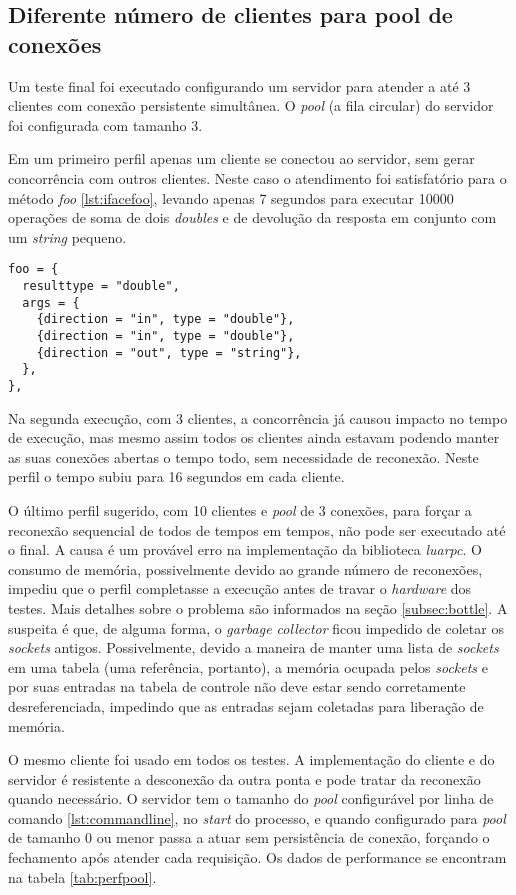 \documentclass[11pt]{article}
\begin{document}
\subsection{Diferente número de clientes para pool de conexões}\label{subsec:diffpool}

Um teste final foi executado configurando um servidor para atender a até 3
clientes com conexão persistente simultânea. O \textit{pool} (a fila circular)
do servidor foi configurada com tamanho 3.

Em um primeiro perfil apenas um cliente se conectou ao servidor, sem gerar
concorrência com outros clientes. Neste caso o atendimento foi satisfatório para
o método \textit{foo} \ref{lst:ifacefoo}, levando apenas 7 segundos para executar
10000 operações de soma de dois \textit{doubles} e de devolução da resposta em
conjunto com um \textit{string} pequeno.

\begin{lstlisting}[caption={Interface foo},label={lst:ifacefoo}]
foo = {
  resulttype = "double",
  args = {
    {direction = "in", type = "double"},
    {direction = "in", type = "double"},
    {direction = "out", type = "string"},
  },
},
\end{lstlisting}

Na segunda execução, com 3 clientes, a concorrência já causou impacto no tempo
de execução, mas mesmo assim todos os clientes ainda estavam podendo manter as
suas conexões abertas o tempo todo, sem necessidade de reconexão. Neste perfil o
tempo subiu para 16 segundos em cada cliente.

O último perfil sugerido, com 10 clientes e \textit{pool} de 3 conexões, para
forçar a reconexão sequencial de todos de tempos em tempos, não pode ser
executado até o final. A causa é um provável erro na implementação da biblioteca
\textit{luarpc}. O consumo de memória, possivelmente devido ao grande número de
reconexões, impediu que o perfil completasse a execução antes de travar o
\textit{hardware} dos testes. Mais detalhes sobre o problema são informados na
seção \ref{subsec:bottle}. A suspeita é que, de alguma forma, o \textit{garbage
collector} ficou impedido de coletar os \textit{sockets} antigos. Possivelmente,
devido a maneira de manter uma lista de \textit{sockets} em uma tabela (uma
referência, portanto), a memória ocupada pelos \textit{sockets} e por suas
entradas na tabela de controle não deve estar sendo corretamente
desreferenciada, impedindo que as entradas sejam coletadas para liberação de
memória.

O mesmo cliente foi usado em todos os testes. A implementação do cliente e do
servidor é resistente a desconexão da outra ponta e pode tratar da reconexão
quando necessário. O servidor tem o tamanho do \textit{pool} configurável por
linha de comando \ref{lst:commandline}, no \textit{start} do processo, e quando
configurado para \textit{pool} de tamanho 0 ou menor passa a atuar sem
persistência de conexão, forçando o fechamento após atender cada requisição. Os
dados de performance se encontram na tabela \ref{tab:perfpool}.
\end{document}
